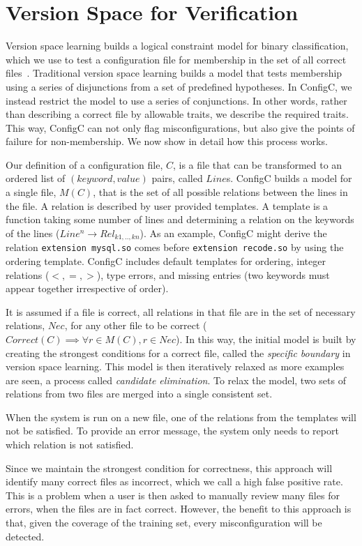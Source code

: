 \section{Version Space for Verification}

Version space learning builds a logical constraint model for binary classification, which we use to test a configuration file for membership in the set of all correct files~\cite{mitchell82}.
Traditional version space learning builds a model that tests membership using a series of disjunctions from a set of predefined hypotheses.
In ConfigC, we instead restrict the model to use a series of conjunctions.
In other words, rather than describing a correct file by allowable traits, we describe the required traits. 
This way, ConfigC can not only flag misconfigurations, but also give the points of failure for non-membership.
We now show in detail how this process works.

Our definition of a configuration file, $C$, is a file that can be transformed to an ordered list of $(keyword, value)$ pairs, called $Line$s.
ConfigC builds a model for a single file, $M(C)$, that is the set of all possible relations between the lines in the file.
A relation is described by user provided templates.
A template is a function taking some number of lines and determining a relation on the keywords of the lines ($Line^{n} \rightarrow Rel_{k1,..,kn}$).
As an example, ConfigC might derive the relation \texttt{extension mysql.so} comes before \texttt{extension recode.so} by using the ordering template.
ConfigC includes default templates for ordering, integer relations ($<,=,>$), type errors, and missing entries (two keywords must appear together irrespective of order).

It is assumed if a file is correct, all relations in that file are in the set of necessary relations, $Nec$, for any other file to be correct ($Correct(C) \implies \forall r \in M(C), r \in Nec$).
In this way, the initial model is built by creating the strongest conditions for a correct file, called the \textit{specific boundary} in version space learning.
This model is then iteratively relaxed as more examples are seen, a process called \textit{candidate elimination}.
To relax the model, two sets of relations from two files are merged into a single consistent set.

When the system is run on a new file, one of the relations from the templates will not be satisfied.
To provide an error message, the system only needs to report which relation is not satisfied.

Since we maintain the strongest condition for correctness, this approach will identify many correct files as incorrect, which we call a high false positive rate.
This is a problem when a user is then asked to manually review many files for errors, when the files are in fact correct.
However, the benefit to this approach is that, given the coverage of the training set, every misconfiguration will be detected.


